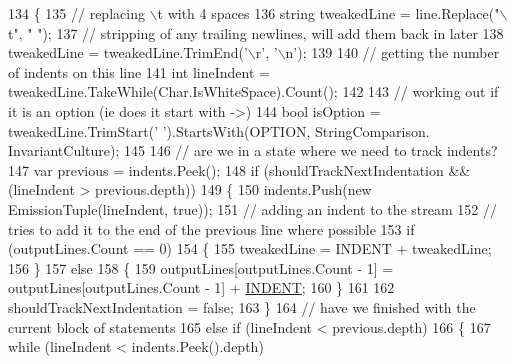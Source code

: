 \begin{DoxyCode}
134                 \{
135                     \textcolor{comment}{// replacing \(\backslash\)t with 4 spaces}
136                     \textcolor{keywordtype}{string} tweakedLine = line.Replace(\textcolor{stringliteral}{"\(\backslash\)t"}, \textcolor{stringliteral}{"    "});
137                     \textcolor{comment}{// stripping of any trailing newlines, will add them back in later}
138                     tweakedLine = tweakedLine.TrimEnd(\textcolor{charliteral}{'\(\backslash\)r'}, \textcolor{charliteral}{'\(\backslash\)n'});
139 
140                     \textcolor{comment}{// getting the number of indents on this line}
141                     \textcolor{keywordtype}{int} lineIndent = tweakedLine.TakeWhile(Char.IsWhiteSpace).Count();
142 
143                     \textcolor{comment}{// working out if it is an option (ie does it start with ->)}
144                     \textcolor{keywordtype}{bool} isOption = tweakedLine.TrimStart(\textcolor{charliteral}{' '}).StartsWith(OPTION, StringComparison.
      InvariantCulture);
145 
146                     \textcolor{comment}{// are we in a state where we need to track indents?}
147                     var previous = indents.Peek();
148                     \textcolor{keywordflow}{if} (shouldTrackNextIndentation && (lineIndent > previous.depth))
149                     \{
150                         indents.Push(\textcolor{keyword}{new} EmissionTuple(lineIndent, \textcolor{keyword}{true}));
151                         \textcolor{comment}{// adding an indent to the stream}
152                         \textcolor{comment}{// tries to add it to the end of the previous line where possible}
153                         \textcolor{keywordflow}{if} (outputLines.Count == 0)
154                         \{
155                             tweakedLine = INDENT + tweakedLine;
156                         \}
157                         \textcolor{keywordflow}{else}
158                         \{
159                             outputLines[outputLines.Count - 1] = outputLines[outputLines.Count - 1] + 
      \hyperlink{a00348_ae3f2190a793ab77428838e58e0e83676}{INDENT};
160                         \}
161 
162                         shouldTrackNextIndentation = \textcolor{keyword}{false};
163                     \}
164                     \textcolor{comment}{// have we finished with the current block of statements}
165                     \textcolor{keywordflow}{else} \textcolor{keywordflow}{if} (lineIndent < previous.depth)
166                     \{
167                         \textcolor{keywordflow}{while} (lineIndent < indents.Peek().depth)

\end{DoxyCode}

